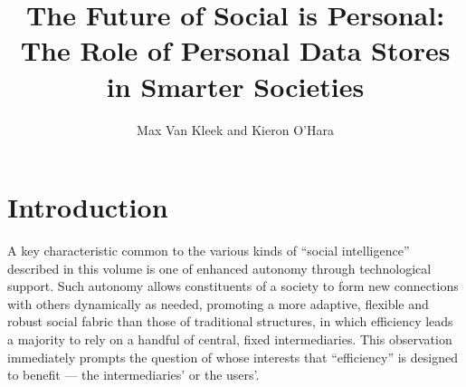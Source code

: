 \documentclass[graybox]{svmult}
\begin{document}
\title*{The Future of Social is Personal: The Role of Personal Data Stores in Smarter Societies}

\author{Max Van Kleek and Kieron O’Hara}

%
%
\maketitle

\section{Introduction}

A key characteristic common to the various kinds of ``social intelligence'' described in this volume is one of enhanced autonomy through technological support.  Such autonomy allows constituents of a society to form new connections with others dynamically as needed, promoting a more adaptive, flexible and robust social fabric than those of traditional structures, in which efficiency leads a majority to rely on a handful of central, fixed intermediaries. This observation immediately prompts the question of whose interests that ``efficiency'' is designed to benefit --- the intermediaries' or the users'.
\end{document}
